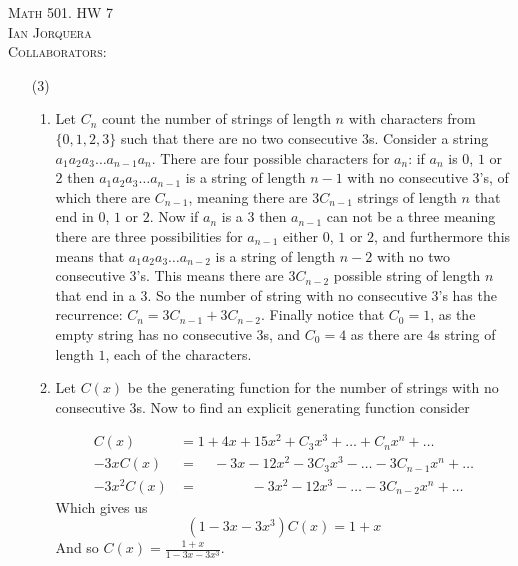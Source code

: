 \documentclass[12pt]{amsart}
\theoremstyle{definition}
\begin{document}
\begin{center}
    \textsc{Math 501. HW 7\\ Ian Jorquera\\ Collaborators:}
\end{center}
\vspace{1em}


\begin{itemize}

\item[(3)] 
\begin{enumerate}[label=(\alph*)]
    \item Let $C_n$ count the number of strings of length $n$ with characters from $\{0,1,2,3\}$ such that there are no two consecutive $3$s. Consider a string $a_1a_2a_3\dots a_{n-1}a_n$. There are four possible characters for $a_n$: if $a_n$ is $0$, $1$ or $2$ then $a_1a_2a_3\dots a_{n-1}$ is a string of length $n-1$ with no consecutive $3$'s, of which there are $C_{n-1}$, meaning there are $3C_{n-1}$ strings of length $n$ that end in $0$, $1$ or $2$. Now if $a_n$ is a $3$ then $a_{n-1}$ can not be a three meaning there are three possibilities for $a_{n-1}$ either $0$, $1$ or $2$, and furthermore this means that $a_1a_2a_3\dots a_{n-2}$ is a string of length $n-2$ with no two consecutive $3$'s. This means there are $3C_{n-2}$ possible string of length $n$ that end in a $3$. So the number of string with no consecutive $3$'s has the recurrence: $C_n=3C_{n-1}+3C_{n-2}$. Finally notice that $C_0=1$, as the empty string has no consecutive $3$s, and $C_0=4$ as there are $4$s string of length $1$, each of the characters.\\
    
    \item 
    Let $C(x)$ be the generating function for the number of strings with no consecutive $3$s. Now to find an explicit generating function consider 

\begin{align*}
    C(x)&=1+4x+15x^2+C_3x^3+\dots+C_nx^n+\dots\\
    -3xC(x)&=\;\;\;\;-3x-12x^2-3C_3x^3-\dots-3C_{n-1}x^n+\dots\\
    -3x^2C(x)&=\;\;\;\;\;\;\;\;\;\;\;\;\;\,-3x^2-12x^3-\dots-3C_{n-2}x^n+\dots
\end{align*}
Which gives us
    $$(1-3x-3x^3)C(x)=1+x$$
And so $C(x)=\displaystyle{\frac{1+x}{1-3x-3x^3}}$.\\


\end{enumerate}
\end{itemize}
\end{document}

